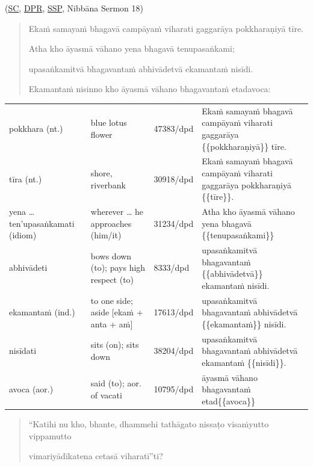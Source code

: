 \documentclass[11pt,oneside]{memoir}
\begin{document}
(\href{https://suttacentral.net/an10.81/pli/ms}{SC}, \href{https://www.digitalpalireader.online/\_dprhtml/index.html?loc=a.9.0.0.1.3.0.m}{DPR}, \href{http://localhost:4848/suttas/an10.81/pli/ms?window\_type=Sutta+Study}{SSP}, Nibbāna Sermon 18)

\begin{quote}
Ekaṁ samayaṁ bhagavā campāyaṁ viharati gaggarāya pokkharaṇiyā tīre.

Atha kho āyasmā vāhano yena bhagavā tenupasaṅkami;

upasaṅkamitvā bhagavantaṁ abhivādetvā ekamantaṁ nisīdi.

Ekamantaṁ nisinno kho āyasmā vāhano bhagavantaṁ etadavoca:
\end{quote}

\begin{longtable}{L{\colOne} L{\colTwo} H H}
pokkhara (nt.) & blue lotus flower & 47383/dpd & Ekaṁ samayaṁ bhagavā campāyaṁ viharati gaggarāya \{\{pokkharaṇiyā\}\} tīre.\\[0pt]
tīra (nt.) & shore, riverbank & 30918/dpd & Ekaṁ samayaṁ bhagavā campāyaṁ viharati gaggarāya pokkharaṇiyā \{\{tīre\}\}.\\[0pt]
yena \ldots{} ten'upasaṅkamati (idiom) & wherever \ldots{} he approaches (him/it) & 31234/dpd & Atha kho āyasmā vāhano yena bhagavā \{\{tenupasaṅkami\}\}\\[0pt]
abhivādeti & bows down (to); pays high respect (to) & 8333/dpd & upasaṅkamitvā bhagavantaṁ \{\{abhivādetvā\}\} ekamantaṁ nisīdi.\\[0pt]
ekamantaṁ (ind.) & to one side; aside [ekaṁ + anta + aṁ] & 17613/dpd & upasaṅkamitvā bhagavantaṁ abhivādetvā \{\{ekamantaṁ\}\} nisīdi.\\[0pt]
nisīdati & sits (on); sits down & 38204/dpd & upasaṅkamitvā bhagavantaṁ abhivādetvā ekamantaṁ \{\{nisīdi\}\}.\\[0pt]
avoca (aor.) & said (to); aor. of vacati & 10795/dpd & āyasmā vāhano bhagavantaṁ etad\{\{avoca\}\}\\[0pt]
\end{longtable}

\begin{quote}
“Katihi nu kho, bhante, dhammehi tathāgato nissaṭo visaṁyutto vippamutto

vimariyādīkatena cetasā viharatī”ti?
\end{quote}
\end{document}
